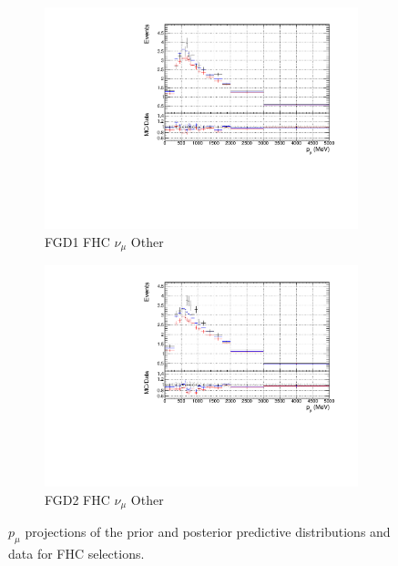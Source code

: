 \begin{figure}[!htbp]
\begin{subfigure}{0.49\textwidth}
  \centering
  \includegraphics[width=\textwidth]{figs/priorpred1D_p_FGD1_numuCC_other}
  \caption{FGD1 FHC $\nu_{\mu}$ Other}
\end{subfigure}
\begin{subfigure}{0.49\textwidth}
  \centering
  \includegraphics[width=\textwidth]{figs/priorpred1D_p_FGD2_numuCC_other}
  \caption{FGD2 FHC $\nu_{\mu}$ Other}
\end{subfigure}
\caption{$p_{\mu}$ projections of the prior and posterior predictive distributions and data for FHC \numu selections.}
\label{fig:priorpost_fhc_p}
\end{figure}

